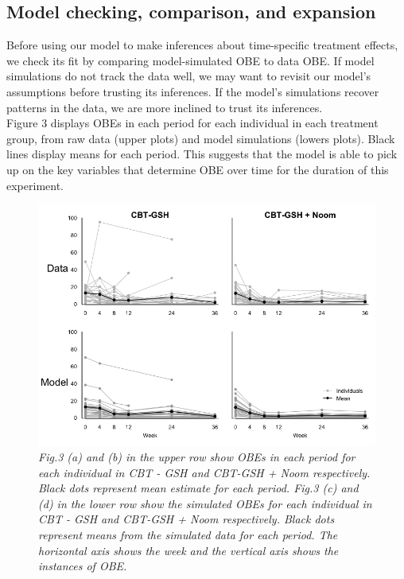 \documentclass{article}
\begin{document}
\subsection{Model checking, comparison, and expansion}
Before using our model to make inferences about time-specific treatment effects, we check its fit by comparing model-simulated OBE to data OBE.  If model simulations do not track the data well, we may want to revisit our model's assumptions before trusting its inferences.  If the model's simulations recover patterns in the data, we are more inclined to trust its inferences. \\
Figure 3 displays OBEs in each period for each individual in each treatment group, from raw data (upper plots) and model simulations (lowers plots).  Black lines display means for each period.  This suggests that the model is able to pick up on the key variables that determine OBE over time for the duration of this experiment.
%
\begin{figure}[H]
\begin{center}
\includegraphics[width=\textwidth, height=\textheight, keepaspectratio]{ppc_sims.png}
\caption{\emph{Fig.3 (a) and (b) in the upper row show OBEs in each period for each individual in CBT - GSH and CBT-GSH + Noom respectively. Black dots represent mean estimate for each  period. Fig.3 (c) and (d) in the lower row show the simulated OBEs for each individual in CBT - GSH and CBT-GSH + Noom respectively. Black dots represent means from the simulated data for each period. The horizontal axis shows the week and the vertical axis shows the instances of OBE.}}
\end{center}
\end{figure}
\end{document}
